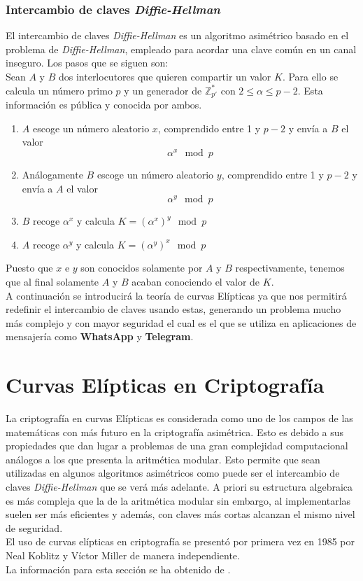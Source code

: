 \subsubsection{Intercambio de claves \emph{Diffie-Hellman}}
El intercambio de claves \emph{Diffie-Hellman} es un algoritmo asimétrico basado en el problema de \emph{Diffie-Hellman}, empleado para acordar una clave común en un canal inseguro. Los pasos que se siguen son:\\
Sean $A$ y $B$ dos interlocutores que quieren compartir un valor $K$. Para ello se calcula un número primo $p$ y un generador \alpha de $\mathbb{Z}^*_{p'}$ con $2\leq \alpha \leq p-2$. Esta información es pública y conocida por ambos.
\begin{enumerate}
	\item $A$ escoge un número aleatorio $x$, comprendido entre 1 y $p-2$ y envía a $B$ el valor 
		$$
			\alpha^x \mod p
		$$
	\item Análogamente $B$ escoge un número aleatorio $y$, comprendido entre 1 y $p-2$ y envía a $A$ el valor 
		$$
			\alpha^y \mod p
		$$

	\item $B$ recoge $\alpha^x$ y calcula $K=(\alpha^x)^y \mod p$
	\item $A$ recoge $\alpha^y$ y calcula $K=(\alpha^y)^x \mod p$
\end{enumerate}
Puesto que $x$ e $y$ son conocidos solamente por $A$ y $B$ respectivamente, tenemos que al final solamente $A$ y $B$ acaban conociendo el valor de $K$.\\
A continuación se introducirá la teoría de curvas Elípticas ya que nos permitirá redefinir el intercambio de claves usando estas, generando un problema mucho más complejo y con mayor seguridad el cual es el que se utiliza en aplicaciones de mensajería como \textbf{WhatsApp} y \textbf{Telegram}.

\section{Curvas Elípticas en Criptografía}
La criptografía en curvas Elípticas es considerada como uno de los campos de las matemáticas con más futuro en la criptografía asimétrica.
Esto es debido a sus propiedades que dan lugar a problemas de una gran complejidad computacional análogos a los que presenta la aritmética modular. 
Esto permite que sean utilizadas en algunos algoritmos asimétricos como puede ser el intercambio de claves \emph{Diffie-Hellman} que se verá más adelante. A priori su 
estructura algebraica es más compleja que la de la aritmética modular sin embargo, al implementarlas suelen ser más eficientes y además, con claves más cortas alcanzan 
el mismo nivel de seguridad.\\
El uso de curvas elípticas en criptografía se presentó por primera vez en 1985 por Neal Koblitz y Víctor Miller de manera independiente.\\
La información para esta sección se ha obtenido de \cite{En2011}.

